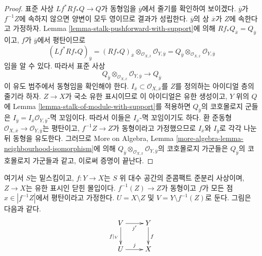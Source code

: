 \begin{proof}
표준 사상 $Lf^*Rf_*Q \to Q$가 동형임을 $\overline{y}$에서 줄기를
확인하여 보이겠다. $\overline{y}$가 $f^{-1}Z$에 속하지 않으면 양변이
모두 영이므로 결과가 성립한다. $\overline{y}$의 상 $\overline{x}$가
$Z$에 속한다고 가정하자. Lemma
\ref{lemma-stalk-pushforward-with-support}에 의해
$Rf_*Q_{\overline{x}} = Q_{\overline{y}}$이고, $f$가 $\overline{y}$에서
평탄이므로
$$
(Lf^*Rf_*Q)_{\overline{y}} =
(Rf_*Q)_{\overline{x}}
\otimes_{\mathcal{O}_{X, \overline{x}}}
\mathcal{O}_{Y, \overline{y}} =
Q_{\overline{y}} \otimes_{\mathcal{O}_{X, \overline{x}}}
\mathcal{O}_{Y, \overline{y}}
$$
임을 알 수 있다. 따라서 표준 사상
$$
Q_{\overline{y}} \otimes_{\mathcal{O}_{X, \overline{x}}}
\mathcal{O}_{Y, \overline{y}}
\longrightarrow Q_{\overline{y}}
$$
이 유도 범주에서 동형임을 확인해야 한다.
$I_{\overline{x}} \subset \mathcal{O}_{X, \overline{x}}$를 $Z$를 정의하는
아이디얼 층의 줄기라 하자.
$Z \to X$가 국소 유한 표시이므로 이 아이디얼은 유한 생성이고,
$Y$ 위의 $Q$에 Lemma \ref{lemma-stalk-of-module-with-support}를 적용하면
$Q_{\overline{y}}$의 코호몰로지 군들은
$I_{\overline{y}} = I_{\overline{x}}\mathcal{O}_{Y, \overline{y}}$-멱
꼬임이다. 따라서 이들은 $I_{\overline{x}}$-멱 꼬임이기도 하다.
환 준동형
$\mathcal{O}_{X, \overline{x}} \to \mathcal{O}_{Y, \overline{y}}$는
평탄이고, $f^{-1}Z \to Z$가 동형이라고 가정했으므로
$I_{\overline{x}}$와 $I_{\overline{y}}$로 각각 나눈 뒤 동형을 유도한다.
그러므로 More on Algebra, Lemma
\ref{more-algebra-lemma-neighbourhood-isomorphism}에 의해
$Q_{\overline{y}} \otimes_{\mathcal{O}_{X, \overline{x}}}
\mathcal{O}_{Y, \overline{y}}$의 코호몰로지 가군들은
$Q_{\overline{y}}$의 코호몰로지 가군들과 같고, 이로써 증명이 끝난다.
\end{proof}

\begin{situation}
\label{situation-formal-glueing}
여기서 $S$는 밑스킴이고, $f : Y \to X$는 $S$ 위 대수 공간의
준콤팩트 준분리 사상이며, $Z \to X$는 유한 표시인 닫힌 몰입이다.
$f^{-1}(Z) \to Z$가 동형이고 $f$가 모든 점
$x \in |f^{-1}Z|$에서 평탄이라고 가정한다.
$U = X \setminus Z$ 및 $V = Y \setminus f^{-1}(Z)$로 둔다.
그림은 다음과 같다.
$$
\xymatrix{
V \ar[r]_{j'} \ar[d]_{f|_V} & Y \ar[d]^f \\
U \ar[r]^j & X
}
$$
\end{situation}

